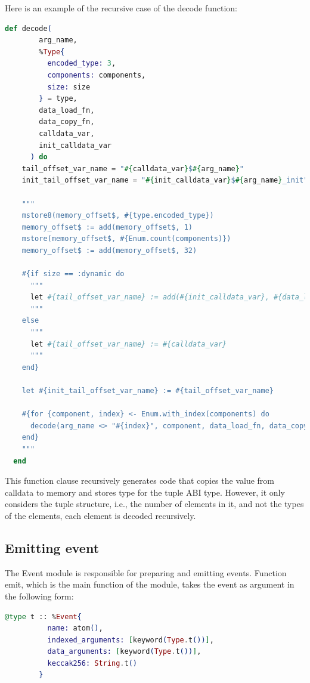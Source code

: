 Here is an example of the recursive case of the decode function:

\begin{lstlisting}[caption={Calldata decoding recursive case}, language=elixir, label={lst:calldata_decoding_recursive}]
  def decode(
        arg_name,
        %Type{
          encoded_type: 3,
          components: components,
          size: size
        } = type,
        data_load_fn,
        data_copy_fn,
        calldata_var,
        init_calldata_var
      ) do
    tail_offset_var_name = "#{calldata_var}$#{arg_name}"
    init_tail_offset_var_name = "#{init_calldata_var}$#{arg_name}_init"

    """
    mstore8(memory_offset$, #{type.encoded_type})
    memory_offset$ := add(memory_offset$, 1)
    mstore(memory_offset$, #{Enum.count(components)})
    memory_offset$ := add(memory_offset$, 32)

    #{if size == :dynamic do
      """
      let #{tail_offset_var_name} := add(#{init_calldata_var}, #{data_load_fn}(#{calldata_var}))
      """
    else
      """
      let #{tail_offset_var_name} := #{calldata_var}
      """
    end}

    let #{init_tail_offset_var_name} := #{tail_offset_var_name}

    #{for {component, index} <- Enum.with_index(components) do
      decode(arg_name <> "#{index}", component, data_load_fn, data_copy_fn, tail_offset_var_name, init_tail_offset_var_name)
    end}
    """
  end
\end{lstlisting}

This function clause recursively generates code that copies the value from calldata to memory and stores type for the tuple ABI type. However, it only considers the tuple structure, i.e., the number of elements in it, and not the types of the elements, each element is decoded recursively.
  
\subsection{Emitting event}

The Event module is responsible for preparing and emitting events. Function emit, which is the main function of the module, takes the event as argument in the following form:

\begin{lstlisting}[language=elixir, caption={Event structure}, label={lst:event_structure}]
  @type t :: %Event{
          name: atom(),
          indexed_arguments: [keyword(Type.t())],
          data_arguments: [keyword(Type.t())],
          keccak256: String.t()
        }
\end{lstlisting}
  
